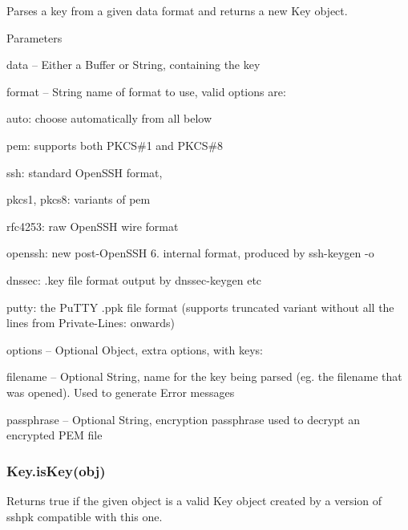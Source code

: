 Parses a key from a given data format and returns a new {\ttfamily Key} object.

Parameters


\begin{DoxyItemize}
\item {\ttfamily data} -- Either a Buffer or String, containing the key
\item {\ttfamily format} -- String name of format to use, valid options are\+:
\begin{DoxyItemize}
\item {\ttfamily auto}\+: choose automatically from all below
\item {\ttfamily pem}\+: supports both P\+K\+CS\#1 and P\+K\+CS\#8
\item {\ttfamily ssh}\+: standard Open\+S\+SH format,
\item {\ttfamily pkcs1}, {\ttfamily pkcs8}\+: variants of {\ttfamily pem}
\item {\ttfamily rfc4253}\+: raw Open\+S\+SH wire format
\item {\ttfamily openssh}\+: new post-\/\+Open\+S\+SH 6. internal format, produced by {\ttfamily ssh-\/keygen -\/o}
\item {\ttfamily dnssec}\+: {\ttfamily .key} file format output by {\ttfamily dnssec-\/keygen} etc
\item {\ttfamily putty}\+: the Pu\+T\+TY {\ttfamily .ppk} file format (supports truncated variant without all the lines from {\ttfamily Private-\/\+Lines\+:} onwards)
\end{DoxyItemize}
\item {\ttfamily options} -- Optional Object, extra options, with keys\+:
\begin{DoxyItemize}
\item {\ttfamily filename} -- Optional String, name for the key being parsed (eg. the filename that was opened). Used to generate Error messages
\item {\ttfamily passphrase} -- Optional String, encryption passphrase used to decrypt an encrypted P\+EM file
\end{DoxyItemize}
\end{DoxyItemize}

\subsubsection*{{\ttfamily Key.\+is\+Key(obj)}}

Returns {\ttfamily true} if the given object is a valid {\ttfamily Key} object created by a version of {\ttfamily sshpk} compatible with this one.

